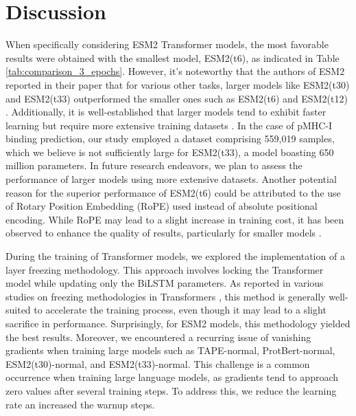 \section{Discussion}

When specifically considering ESM2 Transformer models, the most favorable results were obtained with the smallest model, ESM2(t6), as indicated in Table \ref{tab:comparison_3_epochs}. However, it's noteworthy that the authors of ESM2 reported in their paper that for various other tasks, larger models like ESM2(t30) and ESM2(t33) outperformed the smaller ones such as ESM2(t6) and ESM2(t12) \cite{lin2023evolutionary}. Additionally, it is well-established that larger models tend to exhibit faster learning but require more extensive training datasets \cite{elnaggar2021prottrans}. In the case of pMHC-I binding prediction, our study employed a dataset comprising 559,019 samples, which we believe is not sufficiently large for ESM2(t33), a model boasting 650 million parameters. In future research endeavors, we plan to assess the performance of larger models using more extensive datasets. Another potential reason for the superior performance of ESM2(t6) could be attributed to the use of Rotary Position Embedding (RoPE) used instead of absolute positional encoding. While RoPE may lead to a slight increase in training cost, it has been observed to enhance the quality of results, particularly for smaller models \cite{lin2023evolutionary}.



During the training of Transformer models, we explored the implementation of a layer freezing methodology. This approach involves locking the Transformer model while updating only the BiLSTM parameters. As reported in various studies on freezing methodologies in Transformers \cite{merchant2020happens,lee2019would,kovaleva2019revealing}, this method is generally well-suited to accelerate the training process, even though it may lead to a slight sacrifice in performance. Surprisingly, for ESM2 models, this methodology yielded the best results. Moreover, we encountered a recurring issue of vanishing gradients when training large models such as TAPE-normal, ProtBert-normal, ESM2(t30)-normal, and ESM2(t33)-normal. This challenge is a common occurrence when training large language models, as gradients tend to approach zero values after several training steps. To address this, we reduce the learning rate an increased the warnup steps.


